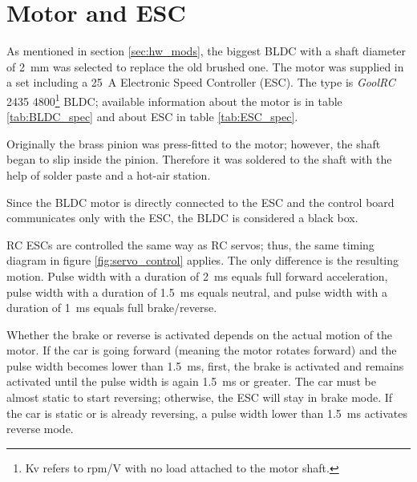 \section{Motor and ESC}
\label{sec:hw_bldc}
As mentioned in section \ref{sec:hw_mods}, the biggest BLDC with a shaft diameter of \SI{2}{\mm} was selected to replace the old brushed one. The motor was supplied in a set including a \SI{25}{\A} Electronic Speed Controller (ESC). The type is \textit{GoolRC} 2435 \SI{4800}{\Kv}\footnote{\unit{Kv} refers to rpm/V with no load attached to the motor shaft.} BLDC; available information about the motor is in table \ref{tab:BLDC_spec} and about ESC in table \ref{tab:ESC_spec}.

Originally the brass pinion was press-fitted to the motor; however, the shaft began to slip inside the pinion. Therefore it was soldered to the shaft with the help of solder paste and a hot-air station.

Since the BLDC motor is directly connected to the ESC and the control board communicates only with the ESC, the BLDC is considered a black box.

RC ESCs are controlled the same way as RC servos; thus, the same timing diagram in figure \ref{fig:servo_control} applies. The only difference is the resulting motion. Pulse width with a duration of \SI{2}{\ms} equals full forward acceleration, pulse width with a duration of \SI{1.5}{\ms} equals neutral, and pulse width with a duration of \SI{1}{\ms} equals full brake/reverse.

Whether the brake or reverse is activated depends on the actual motion of the motor. If the car is going forward (meaning the motor rotates forward) and the pulse width becomes lower than \SI{1.5}{\ms}, first, the brake is activated and remains activated until the pulse width is again \SI{1.5}{\ms} or greater. The car must be almost static to start reversing; otherwise, the ESC will stay in brake mode. If the car is static or is already reversing, a pulse width lower than \SI{1.5}{\ms} activates reverse mode.

